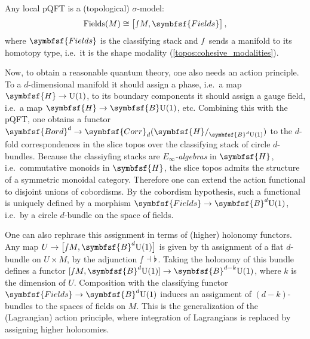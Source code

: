     \begin{property}
        Any local pQFT is a (topological) $\sigma$-model:
        \begin{gather}
            \mathrm{Fields}(M)\cong\bigl[\smallint\!M,\symbfsf{Fields}\bigr]\,,
        \end{gather}
        where $\symbfsf{Fields}$ is the classifying stack and $\smallint$ sends a manifold to its homotopy type, i.e.~it is the shape modality (\cref{topos:cohesive_modalities}).
    \end{property}

    Now, to obtain a reasonable quantum theory, one also needs an action principle. To a $d$-dimensional manifold it should assign a phase, i.e.~a map $\symbfsf{H}\rightarrow\mathrm{U}(1)$, to its boundary components it should assign a gauge field, i.e.~a map $\symbfsf{H}\rightarrow\symbfsf{B}\mathrm{U}(1)$, etc. Combining this with the pQFT, one obtains a functor $\symbfsf{Bord}^d\rightarrow\symbfsf{Corr}_d(\symbfsf{H}/_{\symbfsf{B}^d\mathrm{U}(1)})$ to the $d$-fold correspondences in the slice topos over the classifying stack of circle $d$-bundles. Because the classiyfing stacks are \textit{$E_\infty$-algebras} in $\symbfsf{H}$, i.e.~commutative monoids in $\symbfsf{H}$, the slice topos admits the structure of a symmetric monoidal category. Therefore one can extend the action functional to disjoint unions of cobordisms.
    By the cobordism hypothesis, such a functional is uniquely defined by a morphism $\symbfsf{Fields}\rightarrow\symbfsf{B}^d\mathrm{U}(1)$, i.e.~by a circle $d$-bundle on the space of fields.

    One can also rephrase this assignment in terms of (higher) holonomy functors. Any map $U\rightarrow\bigl[\smallint\!M,\symbfsf{B}^d\mathrm{U}(1)\bigr]$ is given by th assignment of a flat $d$-bundle on $U\times M$, by the adjunction $\smallint\dashv\flat$. Taking the holonomy of this bundle defines a functor $[\smallint\!M,\symbfsf{B}^d\mathrm{U}(1)]\rightarrow\symbfsf{B}^{d-k}\mathrm{U}(1)$, where $k$ is the dimension of $U$. Composition with the classifying functor $\symbfsf{Fields}\rightarrow\symbfsf{B}^d\mathrm{U}(1)$ induces an assignment of $(d-k)$-bundles to the spaces of fields on $M$. This is the generalization of the (Lagrangian) action principle, where integration of Lagrangians is replaced by assigning higher holonomies.